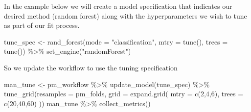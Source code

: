\documentclass[
]{article}
\newenvironment{Shaded}{\begin{snugshade}}{\end{snugshade}}
\newcommand{\AttributeTok}[1]{\textcolor[rgb]{0.77,0.63,0.00}{#1}}
\newcommand{\DecValTok}[1]{\textcolor[rgb]{0.00,0.00,0.81}{#1}}
\newcommand{\FunctionTok}[1]{\textcolor[rgb]{0.00,0.00,0.00}{#1}}
\newcommand{\NormalTok}[1]{#1}
\newcommand{\OtherTok}[1]{\textcolor[rgb]{0.56,0.35,0.01}{#1}}
\newcommand{\SpecialCharTok}[1]{\textcolor[rgb]{0.00,0.00,0.00}{#1}}
\newcommand{\StringTok}[1]{\textcolor[rgb]{0.31,0.60,0.02}{#1}}
\begin{document}
In the example below we will create a model specification that indicates
our desired method (random forest) along with the hyperparameters we
wish to tune as part of our fit process.

\begin{Shaded}
\begin{Highlighting}[]
\NormalTok{tune\_spec }\OtherTok{\textless{}{-}} 
  \FunctionTok{rand\_forest}\NormalTok{(}\AttributeTok{mode =} \StringTok{"classification"}\NormalTok{,}
              \AttributeTok{mtry =} \FunctionTok{tune}\NormalTok{(),}
              \AttributeTok{trees =} \FunctionTok{tune}\NormalTok{()) }\SpecialCharTok{\%\textgreater{}\%}
  \FunctionTok{set\_engine}\NormalTok{(}\StringTok{"randomForest"}\NormalTok{)}
\end{Highlighting}
\end{Shaded}

So we update the workflow to use the tuning specification

\begin{Shaded}
\begin{Highlighting}[]
\NormalTok{man\_tune }\OtherTok{\textless{}{-}}\NormalTok{ pm\_workflow }\SpecialCharTok{\%\textgreater{}\%} 
  \FunctionTok{update\_model}\NormalTok{(tune\_spec) }\SpecialCharTok{\%\textgreater{}\%}
  \FunctionTok{tune\_grid}\NormalTok{(}\AttributeTok{resamples =}\NormalTok{ pm\_folds,}
            \AttributeTok{grid =} \FunctionTok{expand.grid}\NormalTok{(}
                  \AttributeTok{mtry =} \FunctionTok{c}\NormalTok{(}\DecValTok{2}\NormalTok{,}\DecValTok{4}\NormalTok{,}\DecValTok{6}\NormalTok{),}
                  \AttributeTok{trees =} \FunctionTok{c}\NormalTok{(}\DecValTok{20}\NormalTok{,}\DecValTok{40}\NormalTok{,}\DecValTok{60}\NormalTok{)}
\NormalTok{            ))}
\NormalTok{man\_tune }\SpecialCharTok{\%\textgreater{}\%} \FunctionTok{collect\_metrics}\NormalTok{()}
\end{Highlighting}
\end{Shaded}
\end{document}
